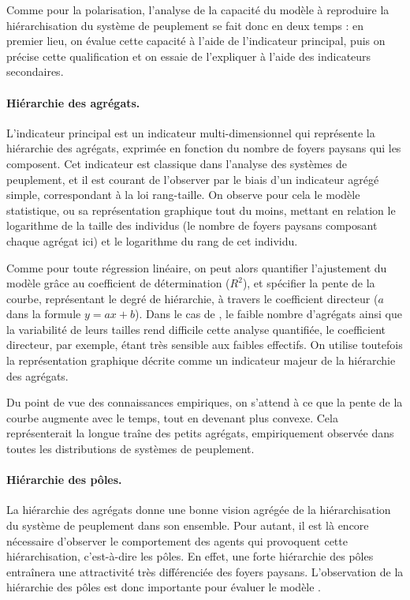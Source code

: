 Comme pour la polarisation, l'analyse de la capacité du modèle à reproduire la hiérarchisation du système de peuplement se fait donc en deux temps :
en premier lieu, on évalue cette capacité à l'aide de l'indicateur principal, puis on précise cette qualification et on essaie de l'expliquer à l'aide des indicateurs secondaires.

\paragraph{Hiérarchie des agrégats.}

L'indicateur principal est un indicateur multi-dimensionnel qui représente la hiérarchie des agrégats, exprimée en fonction du nombre de foyers paysans qui les composent.
Cet indicateur est classique dans l'analyse des systèmes de peuplement, et il est courant de l'observer par le biais d'un indicateur agrégé simple, correspondant à la loi rang-taille.
On observe pour cela le modèle statistique, ou sa représentation graphique tout du moins, mettant en relation le logarithme de la taille des individus (le nombre de foyers paysans composant chaque agrégat ici) et le logarithme du rang de cet individu.

Comme pour toute régression linéaire, on peut alors quantifier l'ajustement du modèle grâce au coefficient de détermination ($R^2$), et spécifier la pente de la courbe, représentant le degré de hiérarchie, à travers le coefficient directeur ($a$ dans la formule $y = ax + b$).
Dans le cas de \simfeodal{}, le faible nombre d'agrégats ainsi que la variabilité de leurs tailles rend difficile cette analyse quantifiée, le coefficient directeur, par exemple, étant très sensible aux faibles effectifs.
On utilise toutefois la représentation graphique décrite comme un indicateur majeur de la hiérarchie des agrégats.

Du point de vue des connaissances empiriques, on s'attend à ce que la pente de la courbe augmente avec le temps, tout en devenant plus convexe.
Cela représenterait la \og longue traîne\fg{} des petits agrégats, empiriquement observée dans toutes les distributions de systèmes de peuplement.

\paragraph{Hiérarchie des pôles.}

La hiérarchie des agrégats donne une bonne vision agrégée de la hiérarchisation du système de peuplement dans son ensemble.
Pour autant, il est là encore nécessaire d'observer le comportement des agents qui provoquent cette hiérarchisation, c'est-à-dire les pôles.
En effet, une forte hiérarchie des pôles entraînera une attractivité très différenciée des foyers paysans.
L'observation de la hiérarchie des pôles est donc importante pour évaluer le modèle \simfeodal{}.

